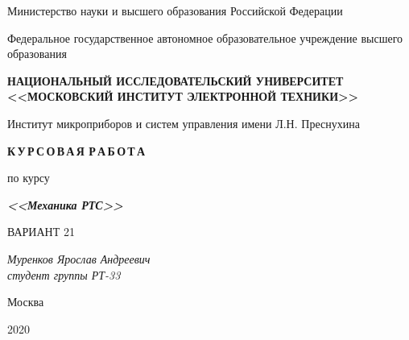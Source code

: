 \thispagestyle{empty}
\setcounter{page}{0}

\begin{center}
    Министерство науки  и высшего образования Российской Федерации
    
    \vspace{1ex}

    Федеральное государственное автономное образовательное учреждение высшего образования
    
    \textbf{НАЦИОНАЛЬНЫЙ ИССЛЕДОВАТЕЛЬСКИЙ УНИВЕРСИТЕТ <<МОСКОВСКИЙ ИНСТИТУТ ЭЛЕКТРОННОЙ ТЕХНИКИ>>}
    
    \vspace{1ex}

    Институт микроприборов и систем управления имени Л.Н. Преснухина
\end{center}

\vspace{13ex}

\begin{center}
    \textbf{К\,У\,Р\,С\,О\,В\,А\,Я Р\,А\,Б\,О\,Т\,А}
    \vspace{1ex}

    по курсу
    
    \textbf{\textit{<<Механика РТС>>}}

    ВАРИАНТ 21
\end{center}

\vspace{20ex}

\begin{flushright}
    \noindent
    \textit{Муренков Ярослав Андреевич} \\
    \textit{студент группы РТ-33}
\end{flushright}

\vfill

\begin{center}
    Москва

    2020
\end{center}

\newpage
